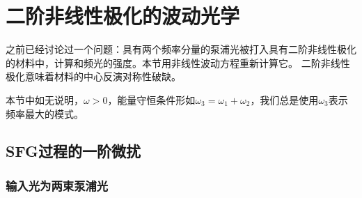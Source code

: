 \section{二阶非线性极化的波动光学}\label{sec:chi-2-wave}

之前已经讨论过一个问题：具有两个频率分量的泵浦光被打入具有二阶非线性极化的材料中，计算和频光的强度。本节用非线性波动方程重新计算它。
二阶非线性极化意味着材料的中心反演对称性破缺。

本节中如无说明，$\omega>0$，能量守恒条件形如$\omega_3 = \omega_1 + \omega_2$，我们总是使用$\omega_3$表示频率最大的模式。

\subsection{SFG过程的一阶微扰}

\subsubsection{输入光为两束泵浦光}

